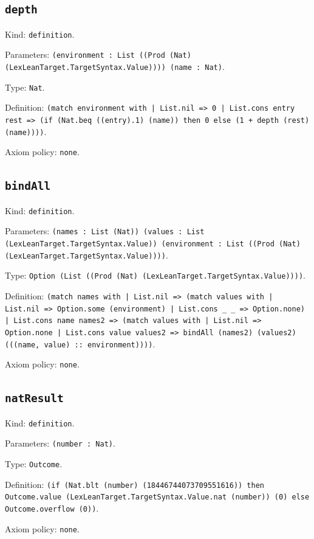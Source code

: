 \documentclass[11pt]{article}
\begin{document}
\subsection*{\texttt{depth}}
\noindent Kind: \texttt{definition}.\par
\noindent Parameters: \texttt{(environment : List ((Prod (Nat) (LexLeanTarget.TargetSyntax.Value)))) (name : Nat)}.\par
\noindent Type: \texttt{Nat}.\par
\noindent Definition: \texttt{(match environment with | List.nil => 0 | List.cons entry rest => (if (Nat.beq ((entry).1) (name)) then 0 else (1 + depth (rest) (name))))}.\par
\noindent Axiom policy: \texttt{none}.\par
\subsection*{\texttt{bindAll}}
\noindent Kind: \texttt{definition}.\par
\noindent Parameters: \texttt{(names : List (Nat)) (values : List (LexLeanTarget.TargetSyntax.Value)) (environment : List ((Prod (Nat) (LexLeanTarget.TargetSyntax.Value))))}.\par
\noindent Type: \texttt{Option (List ((Prod (Nat) (LexLeanTarget.TargetSyntax.Value))))}.\par
\noindent Definition: \texttt{(match names with | List.nil => (match values with | List.nil => Option.some (environment) | List.cons \_ \_ => Option.none) | List.cons name names2 => (match values with | List.nil => Option.none | List.cons value values2 => bindAll (names2) (values2) (((name, value) :: environment))))}.\par
\noindent Axiom policy: \texttt{none}.\par
\subsection*{\texttt{natResult}}
\noindent Kind: \texttt{definition}.\par
\noindent Parameters: \texttt{(number : Nat)}.\par
\noindent Type: \texttt{Outcome}.\par
\noindent Definition: \texttt{(if (Nat.blt (number) (18446744073709551616)) then Outcome.value (LexLeanTarget.TargetSyntax.Value.nat (number)) (0) else Outcome.overflow (0))}.\par
\noindent Axiom policy: \texttt{none}.\par
\end{document}
